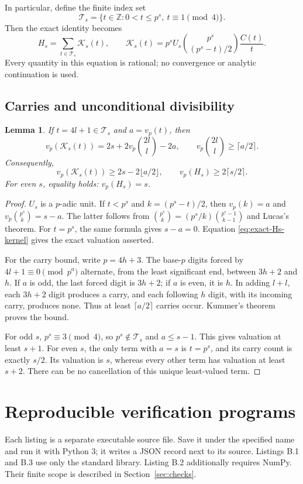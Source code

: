 \documentclass[11pt,a4paper]{article}
\newtheorem{lemma}[theorem]{Lemma}
\begin{document}
In particular, define the finite index set
\[
 \mathcal T_s=\{t\in\mathbb Z:0<t\le p^s,\ t\equiv1\pmod4\}.
\]
Then the exact identity becomes
\begin{equation}\label{eq:exact-Hs-kernel}
 H_s=\sum_{t\in\mathcal T_s}\mathcal K_s(t),\qquad
 \mathcal K_s(t)=p^sU_s\binom{p^s}{(p^s-t)/2}\frac{C(t)}t.
\end{equation}
Every quantity in this equation is rational; no convergence or analytic
continuation is used.

\subsection{Carries and unconditional divisibility}

\begin{lemma}\label{lem:kernel-valuation}
If $t=4l+1\in\mathcal T_s$ and $a=v_p(t)$, then
\[
 v_p(\mathcal K_s(t))=2s+2v_p\binom{2l}{l}-2a,
 \qquad
 v_p\binom{2l}{l}\ge\lceil a/2\rceil.
\]
Consequently,
\[
 v_p(\mathcal K_s(t))\ge2s-2\lfloor a/2\rfloor,
 \qquad
 v_p(H_s)\ge2\lceil s/2\rceil.
\]
For even $s$, equality holds: $v_p(H_s)=s$.
\end{lemma}
\begin{proof}
$U_s$ is a $p$-adic unit.  If $t<p^s$ and
$k=(p^s-t)/2$, then $v_p(k)=a$ and
$v_p\binom{p^s}{k}=s-a$.  The latter follows from
$\binom{p^s}{k}=(p^s/k)\binom{p^s-1}{k-1}$ and Lucas's
theorem.  For $t=p^s$, the same formula gives $s-a=0$.
Equation \eqref{eq:exact-Hs-kernel} gives the exact valuation asserted.

For the carry bound, write $p=4h+3$.  The base-$p$ digits forced by
$4l+1\equiv0\pmod{p^a}$ alternate, from the least significant end,
between $3h+2$ and $h$.  If $a$ is odd, the last forced digit is
$3h+2$; if $a$ is even, it is $h$.  In adding $l+l$, each
$3h+2$ digit produces a carry, and each following $h$ digit,
with its incoming carry, produces none.  Thus at least
$\lceil a/2\rceil$ carries occur.  Kummer's theorem proves the bound.

For odd $s$, $p^s\equiv3\pmod4$, so $p^s\notin\mathcal T_s$ and
$a\le s-1$.  This gives valuation at least $s+1$.
For even $s$, the only term with $a=s$ is $t=p^s$, and its carry
count is exactly $s/2$.  Its valuation is $s$, whereas every other
term has valuation at least $s+2$.  There can be no cancellation of
this unique least-valued term.
\end{proof}



\section{Reproducible verification programs}\label{app:programs}
Each listing is a separate executable source file. Save it under the
specified name and run it with Python 3; it writes a JSON record next
to its source. Listings B.1 and B.3 use only the standard library.
Listing B.2 additionally requires NumPy. Their finite scope is described
in Section~\ref{sec:checks}.
\end{document}
